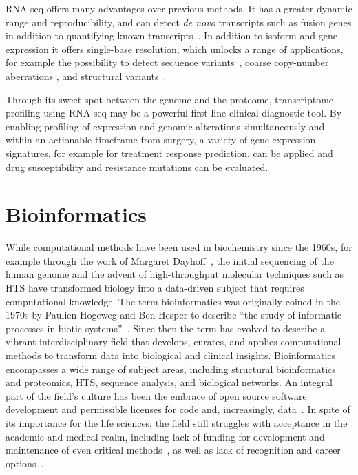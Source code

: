 \documentclass[11pt]{book}
\begin{document}
RNA-seq offers many advantages over previous methods. It has a greater dynamic range and reproducibility, and can detect \textit{de novo} transcripts such as fusion genes in addition to quantifying known transcripts~\cite{Wang:2009}. In addition to isoform and gene expression it offers single-base resolution, which unlocks a range of applications, for example the possibility to detect sequence variants~\cite{Piskol:2013, Horvath:2013, Radenbaugh:2014, Wilkerson:2014, Sheng:2016, Guo:2017, Siegel:2018, Neums:2018}, coarse copy-number aberrations \cite{Patel:2014-RNA-CNA, Crowley:2015-RNA-CNA, Talevich:2018-cnvkitrna, Flensburg:2020}, and structural variants~\cite{Ma:2018-Squid, Cmero:2020}.

Through its sweet-spot between the genome and the proteome, transcriptome profiling using RNA-seq may be a powerful first-line clinical diagnostic tool. By enabling profiling of expression and genomic alterations simultaneously and within an actionable timeframe from surgery, a variety of gene expression signatures, for example for treatment response prediction, can be applied and drug susceptibility and resistance mutations can be evaluated.


\section{Bioinformatics}
\label{sec:bioinformatics}

While computational methods have been used in biochemistry since the 1960s, for example through the work of Margaret Dayhoff~\cite{EckDayhoff:1966}, the initial sequencing of the human genome and the advent of high-throughput molecular techniques such as HTS have transformed biology into a data-driven subject that requires computational knowledge. The term bioinformatics was originally coined in the 1970s by Paulien Hogeweg and Ben Hesper to describe ``the study of informatic processes in biotic systems''~\cite{Hogeweg:2011}. Since then the term has evolved to describe a vibrant interdisciplinary field that develops, curates, and applies computational methods to transform data into biological and clinical insights. Bioinformatics encompasses a wide range of subject areas, including structural bioinformatics and proteomics, HTS, sequence analysis, and biological networks. An integral part of the field's culture has been the embrace of open source software development and permissible licenses for code and, increasingly, data~\cite{Quackenbush:2003, Douglas:2011, Prlic:2012}. In spite of its importance for the life sciences, the field still struggles with acceptance in the academic and medical realm, including lack of funding for development and maintenance of even critical methods~\cite{Siepel:2019}, as well as lack of recognition and career options~\cite{bioinf-career, Lewis:2016, Dragon:2020}.
\end{document}
